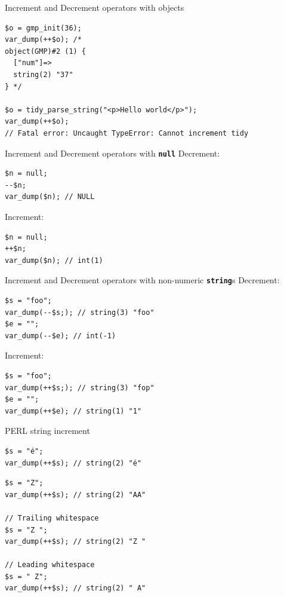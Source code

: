 \documentclass[aspectratio=169]{beamer}
\newcommand{\type}[1]{\texttt{\textbf{#1}}}
\begin{document}
\begin{frame}[fragile]{Increment and Decrement operators with objects}
    \begin{verbatim}
$o = gmp_init(36);
var_dump(++$o); /*
object(GMP)#2 (1) {
  ["num"]=>
  string(2) "37"
} */
 
$o = tidy_parse_string("<p>Hello world</p>");
var_dump(++$o);
// Fatal error: Uncaught TypeError: Cannot increment tidy
    \end{verbatim}
\end{frame}
\begin{frame}[fragile]{Increment and Decrement operators with \type{null}}
    Decrement:
    \begin{verbatim}
$n = null;
--$n;
var_dump($n); // NULL
    \end{verbatim}
    \pause
    Increment:
    \begin{verbatim}
$n = null;
++$n;
var_dump($n); // int(1)
    \end{verbatim}
\end{frame}

\begin{frame}[fragile]{Increment and Decrement operators with non-numeric \type{string}s}
    Decrement:
    \begin{verbatim}
$s = "foo";
var_dump(--$s;); // string(3) "foo"
$e = "";
var_dump(--$e); // int(-1)
    \end{verbatim}
    \pause
    Increment:
    \begin{verbatim}
$s = "foo";
var_dump(++$s;); // string(3) "fop"
$e = "";
var_dump(++$e); // string(1) "1"
    \end{verbatim}
\end{frame}

\begin{frame}[fragile]{PERL string increment}
    \begin{verbatim}
$s = "é";
var_dump(++$s); // string(2) "é"
    \end{verbatim}
    \pause
    \begin{verbatim}
$s = "Z";
var_dump(++$s); // string(2) "AA"

// Trailing whitespace
$s = "Z ";
var_dump(++$s); // string(2) "Z "
 
// Leading whitespace
$s = " Z";
var_dump(++$s); // string(2) " A"
    \end{verbatim}
\end{frame}
\end{document}
